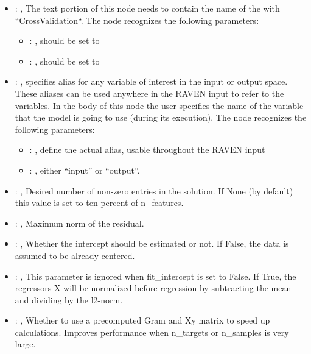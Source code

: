\begin{itemize}
    \item {}: , 
      The text portion of this node needs to contain the name of the  with
               ``CrossValidation``.
      The  node recognizes the following parameters:
        \begin{itemize}
          \item {}: , 
            should be set to 
          \item {}: , 
            should be set to 
      \end{itemize}

    \item {}: , 
      specifies alias for         any variable of interest in the input or output space. These
      aliases can be used anywhere in the RAVEN input to         refer to the variables. In the body
      of this node the user specifies the name of the variable that the model is going to use
      (during its execution).
      The  node recognizes the following parameters:
        \begin{itemize}
          \item {}: , 
            define the actual alias, usable throughout the RAVEN input
          \item {}: , 
            either ``input'' or ``output''.
      \end{itemize}

    \item {}: , 
      Desired number of non-zero entries in the solution. If None (by default)
      this value is set to ten-percent of n\_features.

    \item {}: , 
      Maximum norm of the residual.

    \item {}: , 
      Whether the intercept should be estimated or not. If False,
      the data is assumed to be already centered.

    \item {}: , 
      This parameter is ignored when fit\_intercept is set to False. If True,
      the regressors X will be normalized before regression by subtracting the mean and
      dividing by the l2-norm.

    \item {}: , 
      Whether to use a precomputed Gram and Xy matrix to speed up calculations.
      Improves performance when n\_targets or n\_samples is very large.
  \end{itemize}


